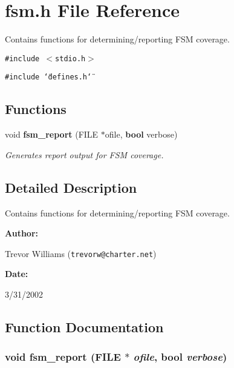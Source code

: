 \section{fsm.h File Reference}
\label{fsm_8h}
Contains functions for determining/reporting FSM coverage. 


{\tt \#include $<$stdio.h$>$}\par
{\tt \#include \char`\"{}defines.h\char`\"{}}\par
\subsection*{Functions}
\begin{CompactItemize}
\item 
void {\bf fsm\_\-report} (FILE $\ast$ofile, {\bf bool} verbose)
\begin{CompactList}\small\item\em Generates report output for FSM coverage.\item\end{CompactList}\end{CompactItemize}


\subsection{Detailed Description}
Contains functions for determining/reporting FSM coverage.



\begin{Desc}
\item[{\bf Author: }]\par
Trevor Williams ({\tt trevorw@charter.net}) \end{Desc}
\begin{Desc}
\item[{\bf Date: }]\par
3/31/2002

\end{Desc}


\subsection{Function Documentation}
\subsubsection{\setlength{\rightskip}{0pt plus 5cm}void fsm\_\-report (FILE $\ast$ {\em ofile}, {\bf bool} {\em verbose})}\label{fsm_8h_a0}



